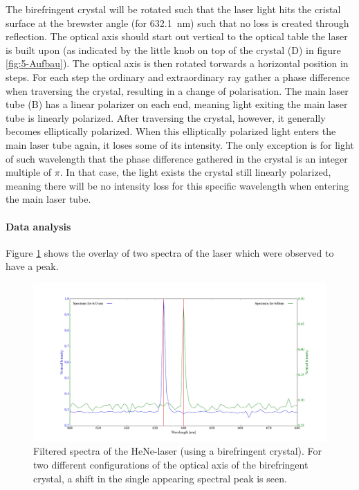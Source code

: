 \documentclass[../main.tex]{subfiles}
\begin{document}
        \noindent The birefringent crystal will be rotated such that the laser light hits the cristal surface at the brewster angle (for \SI{632.1}{nm}) such that no loss is created through reflection. The optical axis should start out vertical to the optical table the laser is built upon (as indicated by the little knob on top of the crystal (D) in figure \ref{fig:5-Aufbau}). The optical axis is then rotated torwards a horizontal position in steps. For each step the ordinary and extraordinary ray gather a phase difference when traversing the crystal, resulting in a change of polarisation. The main laser tube (B) has a linear polarizer on each end, meaning light exiting the main laser tube is linearly polarized. After traversing the crystal, however, it generally becomes elliptically polarized. When this elliptically polarized light enters the main laser tube again, it loses some of its intensity. The only exception is for light of such wavelength that the phase difference gathered in the crystal is an integer multiple of $\pi$. In that case, the light exists the crystal still linearly polarized, meaning there will be no intensity loss for this specific wavelength when entering the main laser tube.

    \paragraph{Data analysis}
        Figure \ref{fig:5-Spektrendoppelbrechung} shows the overlay of two spectra of the laser which were observed to have a peak. 

        \begin{figure}[H]
            \centering 
            \includegraphics[width = 15cm]{Bilddateien/5/5-Spektrendoppelbrechung.jpg}
            \caption{Filtered spectra of the HeNe-laser (using a birefringent crystal). For two different configurations of the optical axis of the birefringent crystal, a shift in the single appearing spectral peak is seen.}
            \label{fig:5-Spektrendoppelbrechung}
        \end{figure}
\end{document}
